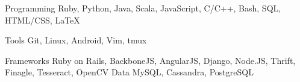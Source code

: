 

\begin{cvskills}

  \cvskill
    {Programming} %
    {Ruby, Python, Java, Scala, JavaScript, C/C++, Bash, SQL, HTML/CSS, LaTeX} %

  \cvskill
    {Tools} %
    {Git, Linux, Android, Vim, tmux} %

  \cvskill
  {Frameworks} %
    {Ruby on Rails, BackboneJS, AngularJS, Django, Node.JS, Thrift, Finagle, Tesseract, OpenCV } %
  \cvskill
  {Data} %
    {MySQL, Cassandra, PostgreSQL} %
\end{cvskills}
